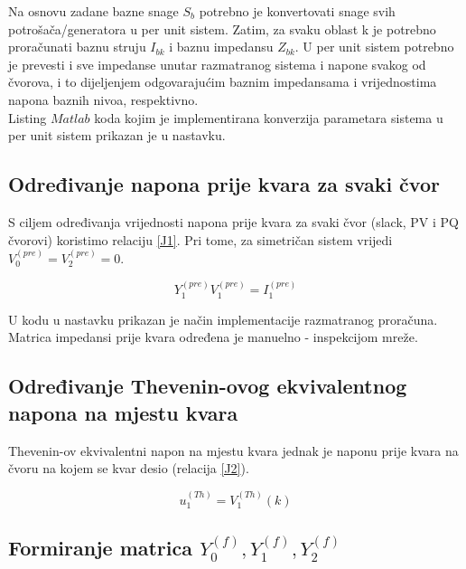 \documentclass[a4paper, 12pt]{article}
\numberwithin{figure}{section}
\numberwithin{equation}{section}
\begin{document}
Na osnovu zadane bazne snage $S_{b}$ potrebno je konvertovati snage svih potrošača/generatora u per unit sistem. Zatim, za svaku oblast k je potrebno proračunati baznu struju $I_{bk}$ i baznu impedansu $Z_{bk}$.
U per unit sistem potrebno je prevesti i sve impedanse unutar razmatranog sistema i napone svakog od čvorova, i to dijeljenjem odgovarajućim baznim impedansama i vrijednostima napona baznih nivoa, respektivno. \\

Listing $\textit{Matlab}$ koda kojim je implementirana konverzija parametara sistema u per unit sistem prikazan je u nastavku.



\subsection{Određivanje napona prije kvara za svaki čvor}

S ciljem određivanja vrijednosti napona prije kvara za svaki čvor (slack, PV i PQ čvorovi) koristimo relaciju \ref{J1}. Pri tome, za simetričan sistem vrijedi $V^{(pre)}_{0}=V^{(pre)}_{2}=0$.

\begin{equation}
    Y^{(pre)}_{1}V^{(pre)}_{1} = I^{(pre)}_{1}
    \label{J1}
\end{equation}

U kodu u nastavku prikazan je način implementacije razmatranog proračuna. Matrica impedansi prije kvara određena je manuelno - inspekcijom mreže.



\subsection{Određivanje  Thevenin-ovog ekvivalentnog napona na mjestu kvara}

Thevenin-ov ekvivalentni napon na mjestu kvara jednak je naponu prije kvara na čvoru na kojem se kvar desio (relacija \ref{J2}).

\begin{equation}
    u^{(Th)}_{1}=V^{(Th)}_{1}(k)
    \label{J2}
\end{equation}



\subsection{Formiranje matrica $Y^{(f)}_{0}, Y^{(f)}_{1}, Y^{(f)}_{2}$}
\end{document}
